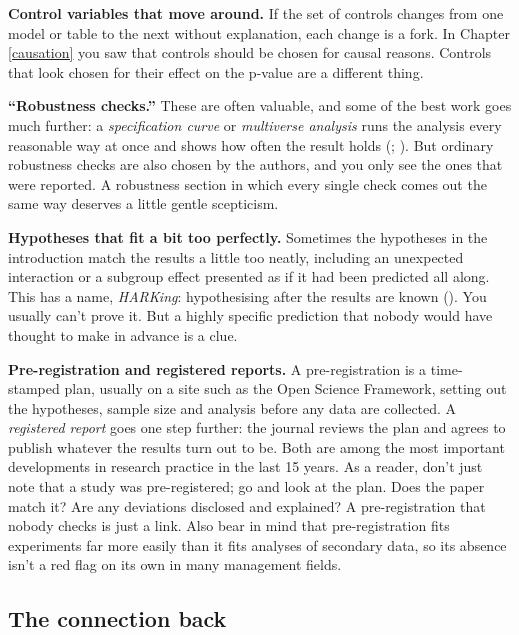 \documentclass[
]{book}
\begin{document}
\textbf{Control variables that move around.} If the set of controls changes from one model or table to the next without explanation, each change is a fork. In Chapter \ref{causation} you saw that controls should be chosen for causal reasons. Controls that look chosen for their effect on the p-value are a different thing.

\textbf{``Robustness checks.''} These are often valuable, and some of the best work goes much further: a \emph{specification curve} or \emph{multiverse analysis} runs the analysis every reasonable way at once and shows how often the result holds (; ). But ordinary robustness checks are also chosen by the authors, and you only see the ones that were reported. A robustness section in which every single check comes out the same way deserves a little gentle scepticism.

\textbf{Hypotheses that fit a bit too perfectly.} Sometimes the hypotheses in the introduction match the results a little too neatly, including an unexpected interaction or a subgroup effect presented as if it had been predicted all along. This has a name, \emph{HARKing}: hypothesising after the results are known (). You usually can't prove it. But a highly specific prediction that nobody would have thought to make in advance is a clue.

\textbf{Pre-registration and registered reports.} A pre-registration is a time-stamped plan, usually on a site such as the Open Science Framework, setting out the hypotheses, sample size and analysis before any data are collected. A \emph{registered report} goes one step further: the journal reviews the plan and agrees to publish whatever the results turn out to be. Both are among the most important developments in research practice in the last 15 years. As a reader, don't just note that a study was pre-registered; go and look at the plan. Does the paper match it? Are any deviations disclosed and explained? A pre-registration that nobody checks is just a link. Also bear in mind that pre-registration fits experiments far more easily than it fits analyses of secondary data, so its absence isn't a red flag on its own in many management fields.

\subsection{The connection back}\label{the-connection-back-9}
\end{document}
